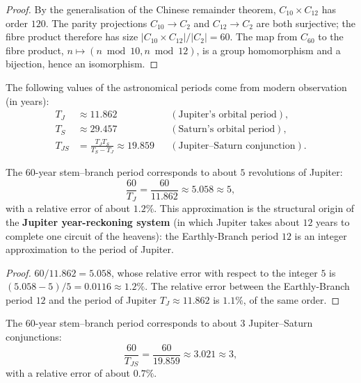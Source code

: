 \begin{proof}
By the generalisation of the Chinese remainder theorem, $C_{10}\times C_{12}$ has order $120$. The parity projections $C_{10}\to C_2$ and $C_{12}\to C_2$ are both surjective; the fibre product therefore has size $|C_{10}\times C_{12}|/|C_2|=60$. The map from $C_{60}$ to the fibre product, $n\mapsto(n\bmod 10,n\bmod 12)$, is a group homomorphism and a bijection, hence an isomorphism.
\end{proof}

\begin{definition}\label{def:planetary_periods_yijing}
The following values of the astronomical periods come from modern observation (in years):
\[
\begin{aligned}
T_J&\approx 11.862 &&(\text{Jupiter's orbital period}),\\
T_S&\approx 29.457 &&(\text{Saturn's orbital period}),\\
T_{JS}&=\frac{T_J T_S}{T_S-T_J}\approx 19.859 &&(\text{Jupiter--Saturn conjunction}).
\end{aligned}
\]
\end{definition}

\begin{proposition}\label{prop:year_ganzhi_jupiter_yijing}
The $60$-year stem--branch period corresponds to about $5$ revolutions of Jupiter:
\[
\frac{60}{T_J}=\frac{60}{11.862}\approx 5.058\approx 5,
\]
with a relative error of about $1.2\%$. This approximation is the structural origin of the \textbf{Jupiter year-reckoning system} (in which Jupiter takes about $12$ years to complete one circuit of the heavens): the Earthly-Branch period $12$ is an integer approximation to the period of Jupiter.
\end{proposition}

\begin{proof}
$60/11.862=5.058$, whose relative error with respect to the integer $5$ is $(5.058-5)/5=0.0116\approx 1.2\%$. The relative error between the Earthly-Branch period $12$ and the period of Jupiter $T_J\approx 11.862$ is $1.1\%$, of the same order.
\end{proof}

\begin{proposition}\label{prop:year_ganzhi_jupiter_saturn_yijing}
The $60$-year stem--branch period corresponds to about $3$ Jupiter--Saturn conjunctions:
\[
\frac{60}{T_{JS}}=\frac{60}{19.859}\approx 3.021\approx 3,
\]
with a relative error of about $0.7\%$.
\end{proposition}

